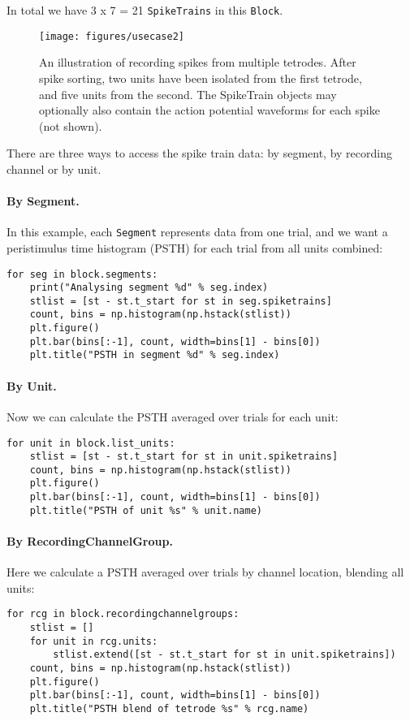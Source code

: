 \documentclass{frontiers}
\begin{document}
In total we have 3 x 7 = 21 \lstinline`SpikeTrains` in this \lstinline`Block`.

\begin{figure}
\centering
\texttt{[image: figures/usecase2]}
\caption{An illustration of recording spikes from multiple tetrodes. After spike sorting, two units have been isolated from the first tetrode, and five units from the second. The SpikeTrain objects may optionally also contain the action potential waveforms for each spike (not shown).
}\label{fig:usecase2} 
\end{figure}

There are three ways to access the spike train data: by segment, by recording channel or by unit.

\paragraph{By Segment.}
In this example, each \lstinline`Segment` represents data from one trial, and we want a peristimulus time histogram (PSTH) for each trial from all units combined:

\begin{lstlisting}[style=display]
for seg in block.segments:
    print("Analysing segment %d" % seg.index)
    stlist = [st - st.t_start for st in seg.spiketrains]
    count, bins = np.histogram(np.hstack(stlist))
    plt.figure()
    plt.bar(bins[:-1], count, width=bins[1] - bins[0])
    plt.title("PSTH in segment %d" % seg.index)
\end{lstlisting}

\paragraph{By Unit.}
Now we can calculate the PSTH averaged over trials for each unit:

\begin{lstlisting}[style=display]
for unit in block.list_units:
    stlist = [st - st.t_start for st in unit.spiketrains]
    count, bins = np.histogram(np.hstack(stlist))
    plt.figure()
    plt.bar(bins[:-1], count, width=bins[1] - bins[0])
    plt.title("PSTH of unit %s" % unit.name)
\end{lstlisting}


\paragraph{By RecordingChannelGroup.}
Here we calculate a PSTH averaged over trials by channel location, blending all units:
\begin{lstlisting}[style=display]
for rcg in block.recordingchannelgroups:
    stlist = []
    for unit in rcg.units:
        stlist.extend([st - st.t_start for st in unit.spiketrains])
    count, bins = np.histogram(np.hstack(stlist))
    plt.figure()
    plt.bar(bins[:-1], count, width=bins[1] - bins[0])
    plt.title("PSTH blend of tetrode %s" % rcg.name)
\end{lstlisting}
\end{document}
